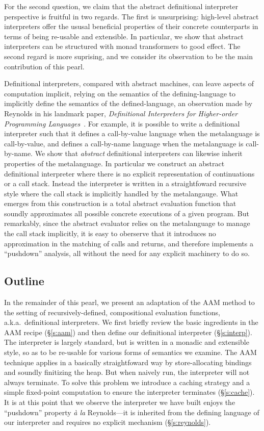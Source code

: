 For the second question, we claim that the abstract definitional
interpreter perspective is fruitful in two regards.  The first is
unsurprising: high-level abstract interpreters offer the ususal
beneficial properties of their concrete counterparts in terms of being
re-usable and extensible.  In particular, we show that abstract
interpreters can be structured with monad transformers to good effect.
The second regard is more suprising, and we consider its observation
to be the main contribution of this pearl.

Definitional interpreters, compared with abstract machines, can leave
aspects of computation implicit, relying on the semantics of the
defining-language to implicitly define the semantics of the
defined-language, an observation made by Reynolds in his landmark
paper, \emph{Definitional Interpreters for Higher-order Programming
  Languages}~\cite{dvanhorn:reynolds-acm72}.  For example, it is
possible to write a definitional interpreter such that it defines a
call-by-value language when the metalanguage is call-by-value, and
defines a call-by-name language when the metalanguage is call-by-name.
We show that \emph{abstract} definitional interpreters can likewise
inherit properties of the metalanguage.  In particular we construct an
abstract definitional interpreter where there is no explicit
representation of continuations or a call stack.  Instead the
interpreter is written in a straightfoward recursive style where the
call stack is implicitly handled by the metalangauge.  What emerges
from this construction is a total abstract evaluation function that
soundly approximates all possible concrete executions of a given
program.  But remarkably, since the abstract evaluator relies on the
metalanguage to manage the call stack implicitly, it is easy to
oberserve that it introduces no approximation in the matching of calls
and returns, and therefore implements a ``pushdown'' analysis, all
without the need for any explicit machinery to do so.

\subsection*{Outline}

In the remainder of this pearl, we present an adaptation of the AAM
method to the setting of recursively-defined, compositional evaluation
functions, a.k.a.~definitional interpreters.  We first briefly review
the basic ingredients in the AAM recipe (\S\ref{s:aam}) and then
define our definitional interpreter (\S\ref{s:interp}).  The
interpreter is largely standard, but is written in a monadic and
extensible style, so as to be re-usable for various forms of semantics
we examine.  The AAM technique applies in a basically straightfoward
way by store-allocating bindings and soundly finitizing the heap.  But
when naively run, the interpreter will not always terminate.  To solve
this problem we introduce a caching strategy and a simple fixed-point
computation to ensure the interpreter terminates (\S\ref{s:cache}).
It is at this point that we observe the interpreter we have built
enjoys the ``pushdown'' property \emph{\`a la} Reynolds---it is
inherited from the defining language of our interpreter and requires
no explicit mechanism (\S\ref{s:reynolds}).

